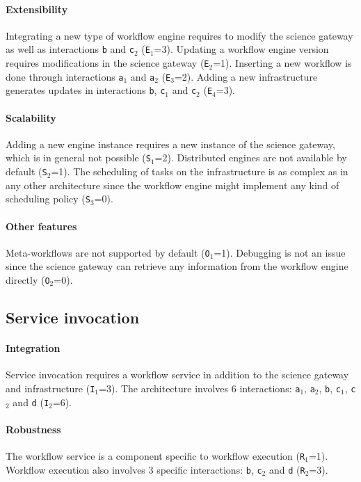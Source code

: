 \documentclass[preprint,3p,twocolumn]{elsarticle}
\begin{document}
\paragraph{Extensibility} Integrating a new type of workflow engine
requires to modify the science gateway as well as interactions
\texttt{b} and \texttt{c$_2$} (\texttt{E$_1$}=3). Updating a workflow
engine version requires modifications in the science gateway
(\texttt{E$_2$}=1).  Inserting a new workflow is done through
interactions \texttt{a$_1$} and \texttt{a$_2$} (\texttt{E$_3$}=2). Adding a new infrastructure generates updates in
interactions \texttt{b}, \texttt{c$_1$} and \texttt{c$_2$}
(\texttt{E$_4$}=3).

\paragraph{Scalability} Adding a new engine instance requires a new
instance of the science gateway, which is in general not possible
(\texttt{S$_1$}=2). Distributed engines are not available by default
(\texttt{S$_2$}=1). The scheduling of tasks on the infrastructure is
as complex as in any other architecture since the workflow engine
might implement any kind of scheduling policy (\texttt{S$_3$}=0).

\paragraph{Other features} Meta-workflows are not supported by default
(\texttt{O$_1$}=1).  Debugging is not an issue since the science
gateway can retrieve any information from the workflow engine directly
(\texttt{O$_2$}=0).

\subsection{Service invocation} 

\paragraph{Integration} Service invocation requires a workflow service
in addition to the science gateway and infrastructure
(\texttt{I$_1$}=3). The architecture involves 6 interactions:
\texttt{a$_1$}, \texttt{a$_2$}, \texttt{b}, \texttt{c$_1$},
\texttt{c$_2$} and \texttt{d} (\texttt{I$_2$}=6).

\paragraph{Robustness} The workflow service is a component specific to
workflow execution (\texttt{R$_1$}=1). Workflow execution also
involves 3 specific interactions: \texttt{b}, 
\texttt{c$_2$} and \texttt{d} (\texttt{R$_2$}=3).
\end{document}
